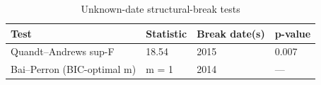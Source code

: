 \begin{table}

\caption{\label{tab:unknown-breaks}Unknown-date structural-break tests}
\centering
\begin{tabular}[t]{llll}
\toprule
Test & Statistic & Break date(s) & p-value\\
\midrule
Quandt--Andrews sup-F & 18.54 & 2015 & 0.007\\
Bai--Perron (BIC-optimal m) & m = 1 & 2014 & —\\
\bottomrule
\end{tabular}
\end{table}
